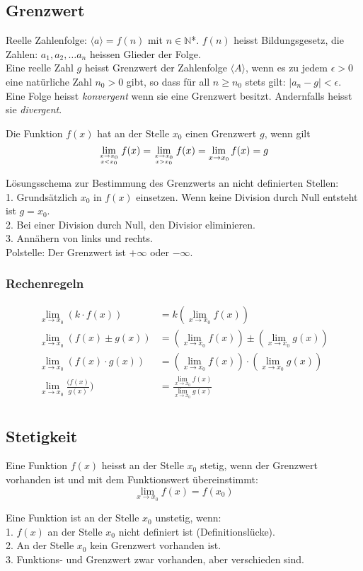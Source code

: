 \subsection{Grenzwert}
Reelle Zahlenfolge: $\langle{a}\rangle = f(n)$ mit $n \in \mathbb{N}$*. $f(n)$ heisst Bildungsgesetz, die Zahlen: $a_1, a_2, \dots a_n$ heissen Glieder der Folge.\\
Eine reelle Zahl $g$ heisst Grenzwert der Zahlenfolge $\langle{A}\rangle$, wenn es zu jedem $\epsilon > 0$ eine
natürliche Zahl $n_0 > 0$ gibt, so dass für all $n \geq n_0$ stets gilt: $\left|a_n - g\right| < \epsilon$.
Eine Folge heisst \textit{konvergent} wenn sie eine Grenzwert besitzt. Andernfalls heisst sie \textit{divergent}.

Die Funktion $f(x)$ hat an der Stelle $x_0$ einen Grenzwert $g$, wenn gilt
\begin{equation*}
	\lim_{x\to x_0\atop x < x_0}f(x) = \lim_{x\to x_0\atop x > x_0}f(x) = \lim_{x\to x_0}f(x) = g 
\end{equation*}

Lösungsschema zur Bestimmung des Grenzwerts an nicht definierten Stellen:\\
1. Grundsätzlich $x_0$ in $f(x)$ einsetzen. Wenn keine Division durch Null entsteht ist $g = x_0$.\\
2. Bei einer Division durch Null, den Divisior eliminieren.\\
3. Annähern von links und rechts.\\

Polstelle: Der Grenzwert ist $+\infty$ oder $-\infty$.

\subsubsection{Rechenregeln}
\begin{align*}
\lim_{x\to x_0}{(k \cdot f(x))}& = k (\lim_{x\to x_0}{f(x)})\\
\lim_{x\to x_0}{(f(x) \pm g(x))}& = (\lim_{x\to x_0}{f(x)}) \pm (\lim_{x\to x_0}{g(x)})\\
\lim_{x\to x_0}{(f(x) \cdot g(x))}& = (\lim_{x\to x_0}{f(x)}) \cdot (\lim_{x\to x_0}{g(x)})\\
\lim_{x\to x_0}{\frac{(f(x)}{g(x)})}& = \frac{\lim_{x\to x_0}f(x)}{\lim_{x\to x_0}g(x)}\\
\end{align*}
\subsection{Stetigkeit}
Eine Funktion $f(x)$ heisst an der Stelle $x_0$ stetig, wenn der Grenzwert vorhanden ist und mit dem Funktionswert übereinstimmt:
\begin{equation*}
	\lim_{x\to x_0}{f(x)} = f(x_0)
\end{equation*}

Eine Funktion ist an der Stelle $x_0$ unstetig, wenn:\\
1. $f(x)$ an der Stelle $x_0$ nicht definiert ist (Definitionslücke).\\
2. An der Stelle $x_0$ kein Grenzwert vorhanden ist.\\
3. Funktions- und Grenzwert zwar vorhanden, aber verschieden sind.\\

